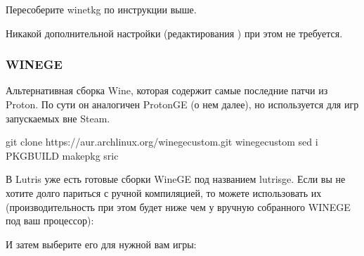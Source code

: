 \documentclass[letterpaper,10pt,russian,openany]{sphinxmanual}
\begin{document}
\sphinxAtStartPar
Пересоберите wine\sphinxhyphen{}tkg по инструкции выше.

\sphinxAtStartPar
Никакой дополнительной настройки (редактирования ) при этом не требуется.

\ignorespaces 

\subsubsection{WINE\sphinxhyphen{}GE}
\label{\detokenize{source/linux-gaming:wine-ge}}\label{\detokenize{source/linux-gaming:wine-ge-custom}}\label{\detokenize{source/linux-gaming:index-7}}
\sphinxAtStartPar
Альтернативная сборка Wine, которая содержит самые последние патчи из Proton.
По сути он аналогичен Proton\sphinxhyphen{}GE (о нем далее), но используется для игр запускаемых вне Steam.

\sphinxAtStartPar
{}

\begin{sphinxVerbatim}[commandchars=\\\{\}]
git clone https://aur.archlinux.org/wine\PYGZhy{}ge\PYGZhy{}custom.git
 wine\PYGZhy{}ge\PYGZhy{}custom
sed \PYGZhy{}i  PKGBUILD  
makepkg \PYGZhy{}sric
\end{sphinxVerbatim}

\sphinxAtStartPar
{}

\sphinxAtStartPar
В Lutris уже есть готовые сборки Wine\sphinxhyphen{}GE под названием lutris\sphinxhyphen{}ge.
Если вы не хотите долго париться с ручной компиляцией, то
можете использовать их (производительность при этом будет ниже
чем у вручную собранного WINE\sphinxhyphen{}GE под ваш процессор):

\noindent{}

\sphinxAtStartPar
И затем выберите его для нужной вам игры:

\noindent{}
\end{document}
